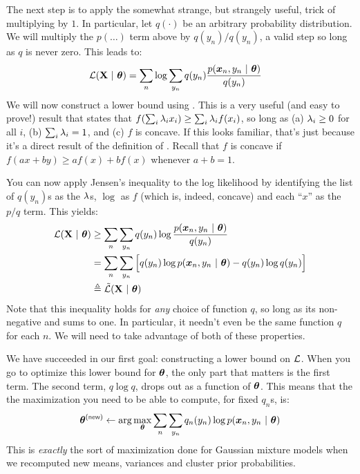 The next step is to apply the somewhat strange, but strangely useful,
trick of multiplying by $1$.  In particular, let $q(\cdot)$ be an
arbitrary probability distribution.  We will multiply the $p(\dots)$
term above by $q(y_n) / q(y_n)$, a valid step so long as $q$ is never
zero.  This leads to:
%
\begin{align}
  \mathcal{L}(\text{\bf X} \textrm{~}\arrowvert\textrm{~} {\boldsymbol{\theta}})
  &= \sum_n \log \sum_{y_n} q(y_n) \frac {p({\boldsymbol{x}}_n, y_n \textrm{~}\arrowvert\textrm{~} {\boldsymbol{\theta}})} {q(y_n)}
\end{align}
%
We will now construct a lower bound using .  This is a very useful (and easy to prove!) result that
states that $f(\sum_i \lambda_i x_i) \geq \sum_i \lambda_i f(x_i)$, so long as
(a) $\lambda_i \geq 0$ for all $i$, (b) $\sum_i \lambda_i = 1$, and (c) $f$ is
concave.  If this looks familiar, that's just because it's a direct
result of the definition of .  Recall that $f$ is
concave if $f(a x + b y) \geq a f(x) + b f(x)$ whenever $a+b=1$.


You can now apply Jensen's inequality to the log likelihood by
identifying the list of $q(y_n)$s as the $\lambda$s, $\log$ as $f$ (which
is, indeed, concave) and each ``$x$'' as the $p/q$ term.  This yields:
%
\begin{align}
  \mathcal{L}(\text{\bf X} \textrm{~}\arrowvert\textrm{~} {\boldsymbol{\theta}})
  &\geq \sum_n \sum_{y_n} q(y_n) \log \frac {p({\boldsymbol{x}}_n, y_n \textrm{~}\arrowvert\textrm{~} {\boldsymbol{\theta}})} {q(y_n)}\\
  &= \sum_n \sum_{y_n} \Big[ q(y_n) \log p({\boldsymbol{x}}_n, y_n \textrm{~}\arrowvert\textrm{~} {\boldsymbol{\theta}}) - q(y_n) \log q(y_n)\Big]\\
  &\triangleq \tilde{\mathcal{L}}(\text{\bf X} \textrm{~}\arrowvert\textrm{~} {\boldsymbol{\theta}})
\end{align}
%
Note that this inequality holds for \emph{any} choice of function $q$,
so long as its non-negative and sums to one.  In particular, it
needn't even be the same function $q$ for each $n$.  We will need to
take advantage of both of these properties.

We have succeeded in our first goal: constructing a lower bound on
$\mathcal{L}$.  When you go to optimize this lower bound for ${\boldsymbol{\theta}}$, the only
part that matters is the first term.  The second term, $q \log q$,
drops out as a function of ${\boldsymbol{\theta}}$.  This means that the the
maximization you need to be able to compute, for fixed $q_n$s, is:
%
\begin{align}
  \vth\newth \leftarrow \arg\max_{\vth} \sum_n \sum_{y_n} q_n(y_n) \log p(\vx_n, y_n \| \vth)
\end{align}
%
This is \emph{exactly} the sort of maximization done for Gaussian
mixture models when we recomputed new means, variances and cluster
prior probabilities.

